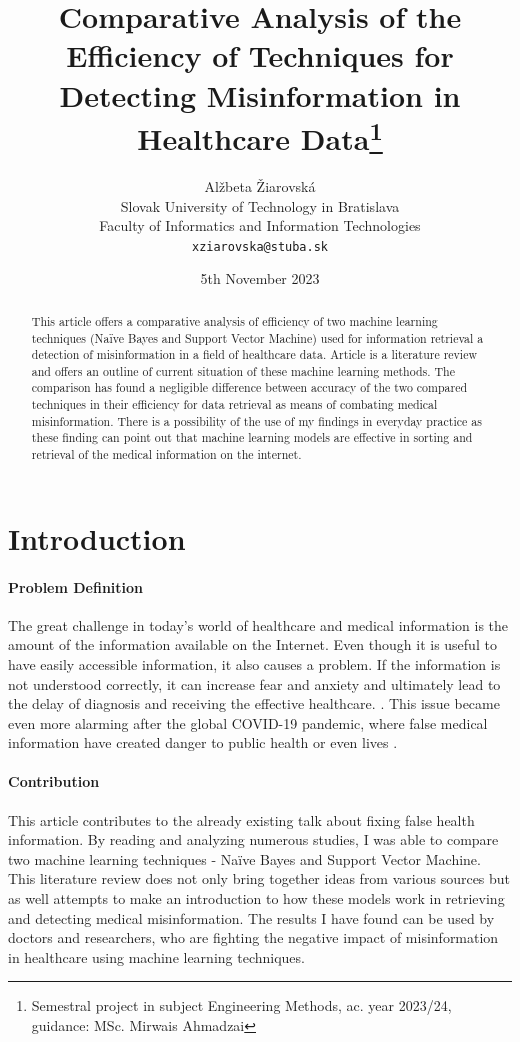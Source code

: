 \documentclass[11pt ,english,a4paper]{article}
\title{Comparative Analysis of the Efficiency of Techniques for Detecting Misinformation in Healthcare Data\thanks{Semestral project in subject Engineering Methods, ac. year 2023/24, guidance: MSc. Mirwais Ahmadzai}}
\author{Alžbeta Žiarovská\\[2pt]
	{\small Slovak University of Technology in Bratislava}\\
	{\small Faculty of Informatics and Information Technologies}\\
	{\small \texttt{xziarovska@stuba.sk}}
	}
\date{\small 5th November 2023}
\begin{document}
\maketitle
\newpage

\begin{abstract}
This article offers a comparative analysis of efficiency of two machine learning techniques (Naïve Bayes and Support Vector Machine) used for information retrieval a detection of misinformation in a field of healthcare data. Article is a literature review and offers an outline of current situation of these machine learning methods. The comparison has found a negligible difference between accuracy of the two compared techniques in their efficiency for data retrieval as means of combating medical misinformation. There is a possibility of the use of my findings in everyday practice as these finding can point out that machine learning models are effective in sorting and retrieval of the medical information on the internet. 
\end{abstract}
\newpage

\section{Introduction}\label{intro}

\paragraph {Problem Definition} The great challenge in today's world of healthcare and medical information is the amount of the information available on the Internet. Even though it is useful to have easily accessible information, it also causes a problem. If the information is not understood correctly, it can increase fear and anxiety and ultimately lead to the delay of diagnosis and receiving the effective healthcare. \cite{wa19sys}. This issue became even more alarming after the global COVID-19 pandemic, where false medical information have created danger to public health or even lives \cite{war18dr}. 

\paragraph {Contribution} This article contributes to the already existing talk about fixing false health information. By reading and analyzing numerous studies, I was able to compare two machine learning techniques - Naïve Bayes and Support Vector Machine. This literature review does not only bring together ideas from various sources but as well attempts to make an introduction to how these models work in retrieving and detecting medical misinformation. The results I have found can be used by doctors and researchers, who are fighting the negative impact of misinformation in healthcare using machine learning techniques. 
\end{document}
